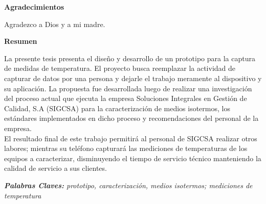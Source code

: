 \clearpage

\thispagestyle{plain}
\begin{center}
	\huge
	\textbf{Agradecimientos}
\end{center}

\par \noindent
Agradezco a Dios y a mi madre.

\clearpage

\thispagestyle{plain}
\begin{center}
	\huge
	\textbf{Resumen}
\end{center}

\par \noindent
La presente tesis presenta el diseño y desarrollo de un prototipo para la captura de medidas de temperatura. El proyecto busca reemplazar la actividad de capturar de datos por una persona y dejarle el trabajo meramente al dispositivo y su aplicación. La propuesta fue desarrollada luego de realizar una investigación del proceso actual que ejecuta la empresa Soluciones Integrales en Gestión de Calidad, S.A (SIGCSA) para la caracterización de medios isotermos, los estándares implementados en dicho proceso y recomendaciones del personal de la empresa.\\ 
El resultado final de este trabajo permitirá al personal de SIGCSA realizar otros labores; mientras su teléfono capturará las mediciones de temperaturas de los equipos a caracterizar, disminuyendo el tiempo de servicio técnico manteniendo la calidad de servicio a sus clientes.

\par \noindent
\textit{\textbf{Palabras Claves:} prototipo, caracterización, medios isotermos; mediciones de temperatura}

\clearpage
